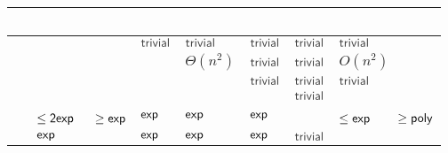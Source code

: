 \renewcommand{\arraystretch}{1.2}
\renewcommand{\hstdef}{1.75}
\begin{tabular}{|l|p{4.2em}|l|p{4.3em}|l|l|p{4.3em}|}
	\hline
	~     & \ODFA                            & \ONFA           & \TDFA                                            & \TNFA     & \OLA      & \ODLA                                            \\ \hline
	\ODFA & \cY                              & $\Cctriv$       & $\Cctriv$                                        & $\Cctriv$ & $\Cctriv$ & $\Cctriv$                                        \\ \hline
	\ONFA & \rbt{$\CsubEq$}                  & \cY             & \cR $\Theta(n^2)$                                & $\Cctriv$ & $\Cctriv$ & \cB $O(n^2)$                                     \\ \hline
	\TDFA & \rbt{$\CsubEq$}                  & \rbt{$\CsubEq$} & \cY                                              & $\Cctriv$ & $\Cctriv$ & $\Cctriv$                                        \\ \hline
	\TNFA & \rbt{$\CsubEq$}                  & \rbt{$\CsubEq$} & \cR \rbt[.3]{$\le\Csubln$} \rbt[.2]{$\ge\Cpoly$} & \cY       & $\Cctriv$ & \cB \rbt[.3]{$\le\Csubln$} \rbt[.2]{$\ge\Cpoly$} \\ \hline
	\OLA  & $\le\Cdexp\hst[1.15]$ $\ge\Cexp$ & $\Cexp$         & \cG $\Cexp$                                      & $\Cexp$   & \cY       & \cG $\le\Cexp\hst$ $\ge\Cpoly$                   \\ \hline
	\ODLA & $\Cexp$                          & $\Cexp$         & $\Cexp$                                          & $\Cexp$   & $\Cctriv$ & \cY                                              \\ \hline
\end{tabular}

